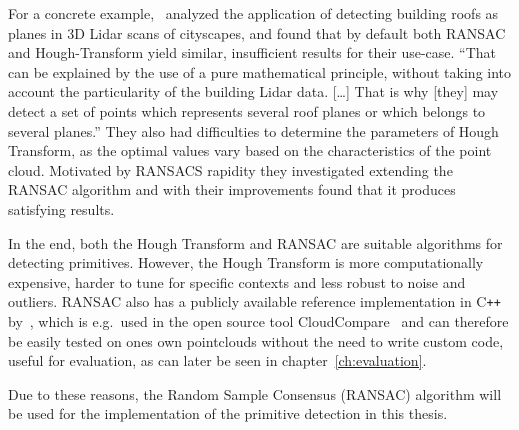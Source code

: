 For a concrete example,~\cite{tarsha-kurdi_hough-transform_2007} analyzed the application of detecting building
roofs as planes in 3D Lidar scans of cityscapes, and found that by default both RANSAC and Hough-Transform yield similar,
insufficient results for their use-case.
“That can be explained by the use of a pure mathematical principle,
without taking into account the particularity of the building Lidar data. […] That is why
[they] may detect a set of points which represents several roof planes or which belongs to several planes.”
They also had difficulties to determine the parameters of Hough Transform,
as the optimal values vary based on the characteristics of the point cloud.
Motivated by RANSACS rapidity they investigated extending the RANSAC algorithm and with their improvements
found that it produces satisfying results.

In the end, both the Hough Transform and RANSAC are suitable algorithms for detecting primitives.
However, the Hough Transform is more computationally expensive, harder to tune for specific contexts and less robust to noise and outliers.
RANSAC also has a publicly available reference implementation in C\texttt{++} by~\parencite{schnabel_efficient_2007},
which is e.g.\ used in the open source tool CloudCompare~\parencite{daniel_girardeau-montaut_cloudcompare_nodate} and can therefore be
easily tested on ones own pointclouds without the need to write custom code, useful for evaluation, as can later be seen in chapter~\ref{ch:evaluation}.

Due to these reasons, the Random Sample Consensus (RANSAC) algorithm will be used for the implementation of the primitive detection in this thesis.
